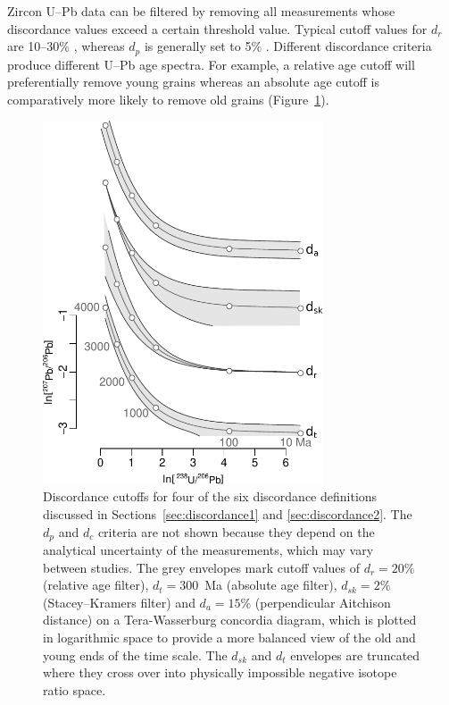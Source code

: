 \documentclass[gchron, manuscript]{copernicus}
\begin{document}
Zircon U--Pb data can be filtered by removing all measurements whose
discordance values exceed a certain threshold value. Typical cutoff
values for $d_r$ are 10--30\% \citep{gehrels2011}, whereas $d_p$ is
generally set to 5\% \citep{spencer2016}. Different discordance
criteria produce different U--Pb age spectra. For example, a relative
age cutoff will preferentially remove young grains whereas an absolute
age cutoff is comparatively more likely to remove old grains
(Figure~\ref{fig:agediscordance}).

\begin{figure}[t]
  \includegraphics[width=8.3cm]{TW-option-1234.pdf}
  \caption{Discordance cutoffs for four of the six discordance
    definitions discussed in Sections~\ref{sec:discordance1} and
    \ref{sec:discordance2}. The $d_{p}$ and $d_c$ criteria are not
    shown because they depend on the analytical uncertainty of the
    measurements, which may vary between studies. The grey envelopes
    mark cutoff values of $d_r=20\%$ (relative age filter),
    $d_t=300$~Ma (absolute age filter), $d_{sk}=2\%$ (Stacey--Kramers
    filter) and $d_{a}=15\%$ (perpendicular Aitchison distance) on a
    Tera-Wasserburg concordia diagram, which is plotted in logarithmic
    space to provide a more balanced view of the old and young ends of
    the time scale. The $d_{sk}$ and $d_t$ envelopes are truncated
    where they cross over into physically impossible negative isotope
    ratio space.}
  \label{fig:agediscordance}
\end{figure}
\end{document}
